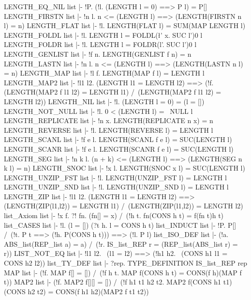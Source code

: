 \THEOREM LENGTH\_EQ\_NIL list
|- !P. (!l. (LENGTH l = 0) ==> P l) = P[]
\ENDTHEOREM
\THEOREM LENGTH\_FIRSTN list
|- !n l. n <= (LENGTH l) ==> (LENGTH(FIRSTN n l) = n)
\ENDTHEOREM
\THEOREM LENGTH\_FLAT list
|- !l. LENGTH(FLAT l) = SUM(MAP LENGTH l)
\ENDTHEOREM
\THEOREM LENGTH\_FOLDL list
|- !l. LENGTH l = FOLDL(\l' x. SUC l')0 l
\ENDTHEOREM
\THEOREM LENGTH\_FOLDR list
|- !l. LENGTH l = FOLDR(\x l'. SUC l')0 l
\ENDTHEOREM
\THEOREM LENGTH\_GENLIST list
|- !f n. LENGTH(GENLIST f n) = n
\ENDTHEOREM
\THEOREM LENGTH\_LASTN list
|- !n l. n <= (LENGTH l) ==> (LENGTH(LASTN n l) = n)
\ENDTHEOREM
\THEOREM LENGTH\_MAP list
|- !l f. LENGTH(MAP f l) = LENGTH l
\ENDTHEOREM
\THEOREM LENGTH\_MAP2 list
|- !l1 l2.
    (LENGTH l1 = LENGTH l2) ==>
    (!f.
      (LENGTH(MAP2 f l1 l2) = LENGTH l1) /\
      (LENGTH(MAP2 f l1 l2) = LENGTH l2))
\ENDTHEOREM
\THEOREM LENGTH\_NIL list
|- !l. (LENGTH l = 0) = (l = [])
\ENDTHEOREM
\THEOREM LENGTH\_NOT\_NULL list
|- !l. 0 < (LENGTH l) = ~NULL l
\ENDTHEOREM
\THEOREM LENGTH\_REPLICATE list
|- !n x. LENGTH(REPLICATE n x) = n
\ENDTHEOREM
\THEOREM LENGTH\_REVERSE list
|- !l. LENGTH(REVERSE l) = LENGTH l
\ENDTHEOREM
\THEOREM LENGTH\_SCANL list
|- !f e l. LENGTH(SCANL f e l) = SUC(LENGTH l)
\ENDTHEOREM
\THEOREM LENGTH\_SCANR list
|- !f e l. LENGTH(SCANR f e l) = SUC(LENGTH l)
\ENDTHEOREM
\THEOREM LENGTH\_SEG list
|- !n k l. (n + k) <= (LENGTH l) ==> (LENGTH(SEG n k l) = n)
\ENDTHEOREM
\THEOREM LENGTH\_SNOC list
|- !x l. LENGTH(SNOC x l) = SUC(LENGTH l)
\ENDTHEOREM
\THEOREM LENGTH\_UNZIP\_FST list
|- !l. LENGTH(UNZIP_FST l) = LENGTH l
\ENDTHEOREM
\THEOREM LENGTH\_UNZIP\_SND list
|- !l. LENGTH(UNZIP_SND l) = LENGTH l
\ENDTHEOREM
\THEOREM LENGTH\_ZIP list
|- !l1 l2.
    (LENGTH l1 = LENGTH l2) ==>
    (LENGTH(ZIP(l1,l2)) = LENGTH l1) /\ (LENGTH(ZIP(l1,l2)) = LENGTH l2)
\ENDTHEOREM
\THEOREM list\_Axiom list
|- !x f. ?! fn. (fn[] = x) /\ (!h t. fn(CONS h t) = f(fn t)h t)
\ENDTHEOREM
\THEOREM list\_CASES list
|- !l. (l = []) \/ (?t h. l = CONS h t)
\ENDTHEOREM
\THEOREM list\_INDUCT list
|- !P. P[] /\ (!t. P t ==> (!h. P(CONS h t))) ==> (!l. P l)
\ENDTHEOREM
\THEOREM list\_ISO\_DEF list
|- (!a. ABS_list(REP_list a) = a) /\
   (!r. IS_list_REP r = (REP_list(ABS_list r) = r))
\ENDTHEOREM
\THEOREM LIST\_NOT\_EQ list
|- !l1 l2. ~(l1 = l2) ==> (!h1 h2. ~(CONS h1 l1 = CONS h2 l2))
\ENDTHEOREM
\THEOREM list\_TY\_DEF list
|- ?rep. TYPE_DEFINITION IS_list_REP rep
\ENDTHEOREM
\THEOREM MAP list
|- (!f. MAP f[] = []) /\ (!f h t. MAP f(CONS h t) = CONS(f h)(MAP f t))
\ENDTHEOREM
\THEOREM MAP2 list
|- (!f. MAP2 f[][] = []) /\
   (!f h1 t1 h2 t2.
     MAP2 f(CONS h1 t1)(CONS h2 t2) = CONS(f h1 h2)(MAP2 f t1 t2))
